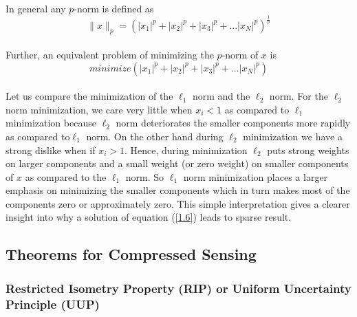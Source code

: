 \paragraph{}In general any $p$-norm is defined as 
\begin{equation}
 \parallel x \parallel_p = ( |x_1|^p + |x_2|^p + |x_3|^p +... |x_N|^p )^{\frac{1}{p}}
\label{1.7}
\end{equation}

\paragraph{}Further, an equivalent problem of minimizing the $p$-norm of $x$ is 
\begin{equation}
 minimize ( |x_1|^p + |x_2|^p + |x_3|^p +... |x_N|^p )
\label{1.8}
\end{equation}

\paragraph{}Let us compare the minimization of the $\ell_1$ norm and the $\ell_2$ norm. For the 
$\ell_2$ norm minimization, we care very little when $x_i < 1$ as compared to $\ell_1$ minimization because $\ell_2$ norm deteriorates
the smaller components more rapidly as compared to$ \ell_1$ norm. On the other hand 
during $\ell_2$ minimization we have a strong dislike when if $x_i > 1$. Hence, during minimization $\ell_2$
puts strong weights on larger components and a small weight (or zero weight) on smaller components of $x$ as
compared to the $\ell_1$ norm. So $\ell_1$ norm minimization places a larger emphasis on minimizing the smaller components
which in turn makes most of the components zero or approximately zero. This simple interpretation gives a clearer 
insight into why a solution of equation (\ref{1.6}) leads to sparse result. 


\subsection{Theorems for Compressed Sensing}
\label{s:cs_theorems}

\subsubsection{Restricted Isometry Property (RIP) or Uniform Uncertainty Principle (UUP)}

